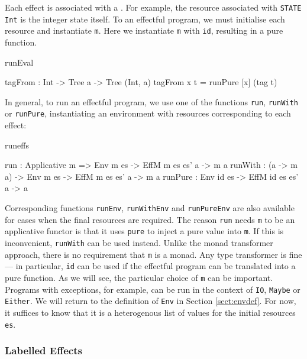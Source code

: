 \noindent
Each effect is associated with a . For example, the resource
associated with \texttt{STATE Int} is the integer state itself.  To 
an effectful program, we must initialise each resource and instantiate
\texttt{m}. Here we instantiate \texttt{m} with \texttt{id}, resulting in a
pure function.

\begin{SaveVerbatim}{runEval}

tagFrom : Int -> Tree a -> Tree (Int, a)
tagFrom x t = runPure [x] (tag t)

\end{SaveVerbatim}

\noindent
In general, to run an effectful program, we use one of the functions
\texttt{run}, \texttt{runWith} or \texttt{runPure}, instantiating an
environment with resources corresponding to each effect:

\begin{SaveVerbatim}{runeffs}

run     : Applicative m => 
          Env m es -> EffM m es es' a -> m a
runWith : (a -> m a) -> 
          Env m es -> EffM m es es' a -> m a
runPure : Env id es -> EffM id es es' a -> a

\end{SaveVerbatim}

\noindent
Corresponding functions \texttt{runEnv}, \texttt{runWithEnv} and
\texttt{runPureEnv} are also available for cases when the final resources are
required.  The reason \texttt{run} needs \texttt{m} to be an applicative
functor
is that it uses \texttt{pure} to inject a pure value into \texttt{m}. If this
is inconvenient, \texttt{runWith} can be used instead. Unlike the
monad transformer approach, there is no requirement that
\texttt{m} is a monad. Any type transformer is fine --- in particular,
\texttt{id} can be used if
the effectful program can be translated into a pure function.
%
As we will see, the particular choice of \texttt{m} can be
important. Programs with exceptions, for example, can be run
in the context of \texttt{IO}, \texttt{Maybe} or \texttt{Either}.
%
We will return to the definition of \texttt{Env} in Section \ref{sect:envdef}.
For now, it suffices to know that it is a heterogenous list of values
for the initial resources \texttt{es}.

\subsubsection{Labelled Effects}

